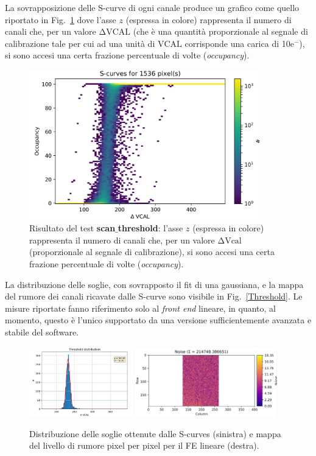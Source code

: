 \begin{description}
La sovrapposizione delle S-curve di ogni canale produce un grafico come quello riportato in Fig.~\ref{Scurves} dove l'asse $z$ (espressa in colore) rappresenta il numero di canali che, per un valore $\mathrm{\Delta VCAL}$ (che \`e una quantit\`a proporzionale al segnale di calibrazione tale per cui ad una unit\`a di $\mathrm{VCAL}$ corrisponde una carica di 10e$^-$), si sono accesi una certa frazione percentuale di volte ({\em occupancy}).
\begin{figure}
\centering
\includegraphics[width=0.9\textwidth]{Immagini/Scurves}
\caption{Risultato del test \textbf{scan$\_$threshold}: l'asse $z$ (espressa in colore) rappresenta il numero di canali che, per un valore $\mathrm{\Delta Vcal}$ (proporzionale al segnale di calibrazione), si sono accesi una certa frazione percentuale di volte ({\em occupancy}).}
\label{Scurves}
\end{figure}
La distribuzione delle soglie, con sovrapposto il fit di una gaussiana, e la mappa del rumore dei canali ricavate dalle S-curve sono visibile in Fig.~\ref{Threshold}. Le misure riportate fanno riferimento solo al \textit{front end} lineare, in quanto, al momento, questo \`e l'unico supportato da una versione sufficientemente avanzata e stabile del software.
\begin{figure}
\centering
\includegraphics[width=0.4\textwidth]{Immagini/Threshold}
\hfill
\includegraphics[width=0.55\textwidth]{Immagini/NoiseMap}
\caption{Distribuzione delle soglie ottenute dalle S-curves (sinistra) e mappa del livello di rumore pixel per pixel per il FE lineare (destra).}
\label{Threshold}
\label{NoiseMap}
\end{figure}


\end{description}
